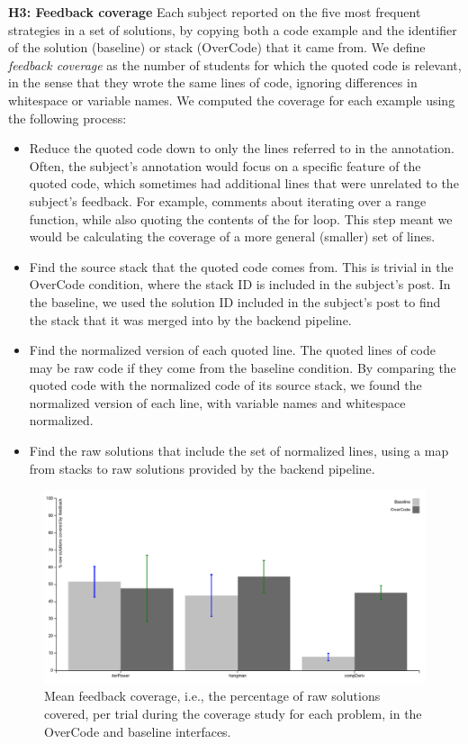 {\bf H3: Feedback coverage} Each subject reported on the five most frequent strategies in a set of solutions, by copying both a code example and the identifier of the solution (baseline) or stack (OverCode) that it came from. We define \emph{feedback coverage} as the number of students for which the quoted code is relevant, in the sense that they wrote the same lines of code, ignoring differences in whitespace or variable names. We computed the coverage for each example using the following process:
\begin{itemize}
\item Reduce the quoted code down to only the lines referred to in the annotation. Often, the subject's annotation would focus on a specific feature of the quoted code, which sometimes had additional lines that were unrelated to the subject's feedback. For example, comments about iterating over a range function, while also quoting the contents of the for loop. This step meant we would be calculating the coverage of a more general (smaller) set of lines.

\item Find the source stack that the quoted code comes from. This is trivial in the OverCode condition, where the stack ID is included in the subject's post. In the baseline, we used the solution ID included in the subject's post to find the stack that it was merged into by the backend pipeline.

\item Find the normalized version of each quoted line. The quoted lines of code may be raw code if they come from the baseline condition. By comparing the quoted code with the normalized code of its source stack, we found the normalized version of each line, with variable names and whitespace normalized.

\item Find the raw solutions that include the set of normalized lines, using a map from stacks to raw solutions provided by the backend pipeline.
\end{itemize}

\begin{figure}[b!]
\includegraphics[width=0.6\paperwidth]{Body/figures/overcode/feedbackCoverage.pdf}
\caption{Mean feedback coverage, i.e., the percentage of raw solutions covered, per trial during the coverage study for each problem, in the OverCode and baseline interfaces.}
\label{aveCoveragePerPost}
\end{figure}

